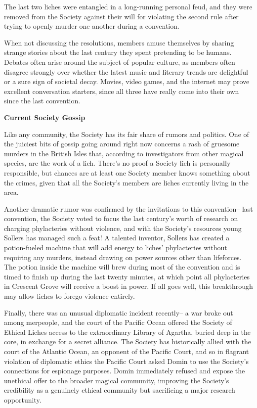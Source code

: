 \documentclass[blue]{Sel}
\begin{document}
The last two liches were entangled in a long-running personal feud, and they were removed from the Society against their will for violating the second rule after trying to openly murder one another during a convention.

When not discussing the resolutions, members amuse themselves by sharing strange stories about the last century they spent pretending to be humans. Debates often arise around the subject of popular culture, as members often disagree strongly over whether the latest music and literary trends are delightful or a sure sign of societal decay. Movies, video games, and the internet may prove excellent conversation starters, since all three have really come into their own since the last convention.

\textbf{Current Society Gossip}

Like any community, the Society has its fair share of rumors and politics. One of the juiciest bits of gossip going around right now concerns a rash of gruesome murders in the British Isles that, according to investigators from other magical species, are the work of a lich. There's no proof a Society lich is personally responsible, but chances are at least one Society member knows something about the crimes, given that all the Society's members are liches currently living in the area.

Another dramatic rumor was confirmed by the invitations to this convention-- last convention, the Society voted to focus the last century's worth of research on charging phylacteries without violence, and with the Society's resources young Sollers has managed such a feat! A talented inventor, Sollers has created a potion-fueled machine that will add energy to liches' phylacteries without requiring any murders, instead drawing on power sources other than lifeforces. The potion inside the machine will brew during most of the convention and is timed to finish up during the last twenty minutes, at which point all phylacteries in Crescent Grove will receive a boost in power. If all goes well, this breakthrough may allow liches to forego violence entirely.

Finally, there was an unusual diplomatic incident recently-- a war broke out among merpeople, and the court of the Pacific Ocean offered the Society of Ethical Liches access to the extraordinary Library of Agartha, buried deep in the core, in exchange for a secret alliance. The Society has historically allied with the court of the Atlantic Ocean, an opponent of the Pacific Court, and so in flagrant violation of diplomatic ethics the Pacific Court asked Domin to use the Society's connections for espionage purposes. Domin immediately refused and expose the unethical offer to the broader magical community, improving the Society's credibility as a genuinely ethical community but sacrificing a major research opportunity.
\end{document}
